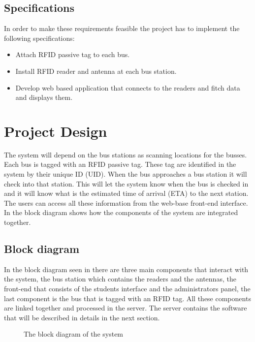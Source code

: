 \documentclass[a4paper,twoside]{IEEEtran}
\begin{document}
\subsection{Specifications}
In order to make these requirements feasible the project has to implement the following specifications:
\begin{itemize}
\item 
Attach RFID passive tag to each bus.
\item
Install RFID reader and antenna at each bus station.
\item
Develop web based application that connects to the readers and fitch data and displays them.
\end{itemize}


\section{Project Design}
The system will depend on the bus stations as scanning locations for the busses. Each bus is tagged with an RFID passive tag. These tag are identified in the system by their unique ID (UID). When the bus approaches a bus station it will check into that station. This will let the system know when the bus is checked in and it will know what is the estimated time of arrival (ETA) to the next station. The users can access all these information from the web-base front-end interface. In  the block diagram shows how the components of the system are integrated together.
\subsection{Block diagram}
In the block diagram seen in  there are three main components that interact with the system, the bus station which contains the readers and the antennas, the front-end that consists of the students interface and the administrators panel, the last component is the bus that is tagged with an RFID tag. All these components are linked together and processed in the server. The server contains the software that will be described in details in the next section.
\begin{figure}
\centering
{}
\caption{The block diagram of the system}
\label{blockdiagram}
\end{figure}
\end{document}
